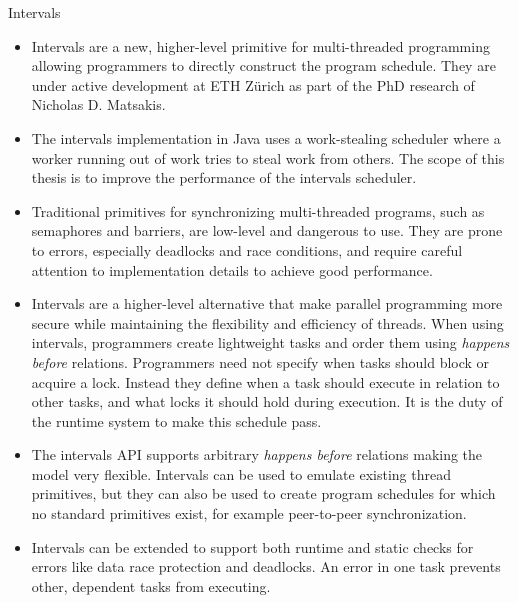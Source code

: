 \begin{frame}{Intervals}
  \begin{itemize}
  \item Intervals are a new, higher-level primitive for multi-threaded
    programming allowing programmers to directly construct the program
    schedule. They are under active development at ETH Zürich as part
    of the PhD research of Nicholas D. Matsakis.
  \item The intervals implementation in Java uses a work-stealing
    scheduler where a worker running out of work tries to steal work
    from others. The scope of this thesis is to improve the
    performance of the intervals scheduler.
  \item Traditional primitives for synchronizing multi-threaded
    programs, such as semaphores and barriers, are low-level and
    dangerous to use. They are prone to errors, especially deadlocks
    and race conditions, and require careful attention to
    implementation details to achieve good performance.
  \item Intervals are a higher-level alternative that make parallel
    programming more secure while maintaining the flexibility and
    efficiency of threads. When using intervals, programmers create
    lightweight tasks and order them using \emph{happens before}
    relations. Programmers need not specify when tasks should block or
    acquire a lock. Instead they define when a task should execute in
    relation to other tasks, and what locks it should hold during
    execution. It is the duty of the runtime system to make this
    schedule pass.
  \item The intervals API supports arbitrary \emph{happens before}
    relations making the model very flexible. Intervals can be used to
    emulate existing thread primitives, but they can also be used to
    create program schedules for which no standard primitives exist,
    for example peer-to-peer synchronization.
  \item Intervals can be extended to support both runtime and static
    checks for errors like data race protection and deadlocks. An
    error in one task prevents other, dependent tasks from executing.
  \end{itemize}
\end{frame}

